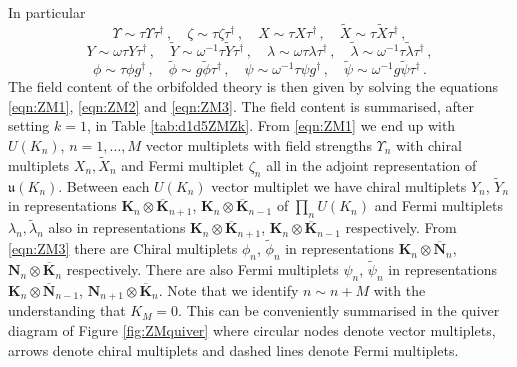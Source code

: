 \documentclass[main.tex]{subfiles}
\begin{document}
In particular
\begin{equation}
\Upsilon\sim \tau\Upsilon\tau^{\dagger}\,,\quad \zeta\sim\tau\zeta\tau^{\dagger}\,,\quad X\sim \tau X\tau^{\dagger}\,,\quad \widetilde{X}\sim\tau\widetilde{X}\tau^{\dagger}\,,\label{eqn:ZM1}
\end{equation}
\begin{equation}
Y\sim \omega\tau Y\tau^{\dagger}\,,\quad \widetilde{Y}\sim \omega^{-1}\tau\widetilde{Y}\tau^{\dagger}\,,\quad \lambda\sim \omega\tau\lambda\tau^{\dagger}\,,\quad \widetilde{\lambda}\sim \omega^{-1}\tau\widetilde{\lambda}\tau^{\dagger}\,,\label{eqn:ZM2}
\end{equation}
\begin{equation}
\phi\sim \tau\phi g^{\dagger}\,,\quad \widetilde{\phi}\sim g\widetilde{\phi}\tau^{\dagger}\,,\quad \psi\sim \omega^{-1}\tau\psi g^{\dagger}\,,\quad \widetilde{\psi}\sim \omega^{-1}g\widetilde{\psi}\tau^{\dagger} \,.\label{eqn:ZM3}
\end{equation}
The field content of the orbifolded theory is then given by solving the  equations \eqref{eqn:ZM1}, \eqref{eqn:ZM2} and \eqref{eqn:ZM3}. The field content is summarised, after setting $k=1$, in Table \ref{tab:d1d5ZMZk}.
From \eqref{eqn:ZM1} we end up with $U(K_n)$, $n=1,\dots, M$ vector multiplets with field strengths $\Upsilon_n$ with chiral multiplets $X_n,\widetilde{X}_n$ and Fermi multiplet $\zeta_n$ all in the adjoint representation of $\mathfrak{u}(K_n)$.
Between each $U(K_n)$ vector multiplet we have chiral multiplets $Y_n$, $\widetilde{Y}_n$ in representations $\mathbf{K}_n\otimes \overline{\mathbf{K}}_{n+1}$, $\mathbf{K}_n\otimes \overline{\mathbf{K}}_{n-1}$ of $\prod_nU\left(K_n\right)$ and Fermi multiplets $\lambda_n,\widetilde{\lambda}_n$ also in representations $\mathbf{K}_n\otimes \overline{\mathbf{K}}_{n+1}$, $\mathbf{K}_n\otimes \overline{\mathbf{K}}_{n-1}$ respectively.
From \eqref{eqn:ZM3} there are Chiral multiplets $\phi_n$, $\widetilde{\phi}_n$ in representations $\mathbf{K}_n\otimes\overline{\mathbf{N}}_n$, $\mathbf{N}_n\otimes\overline{\mathbf{K}}_n$ respectively. There are also Fermi multiplets $\psi_n$, $\widetilde{\psi}_n$ in representations $\mathbf{K}_n\otimes \overline{\mathbf{N}}_{n-1}$, $\mathbf{N}_{n+1}\otimes \overline{\mathbf{K}}_{n}$.
Note that we identify $n\sim n+M$ with the understanding that $K_M=0$.
This can be conveniently summarised in the quiver diagram of Figure \ref{fig:ZMquiver} where circular nodes denote vector multiplets, arrows denote chiral multiplets and dashed lines denote Fermi multiplets.
\end{document}
